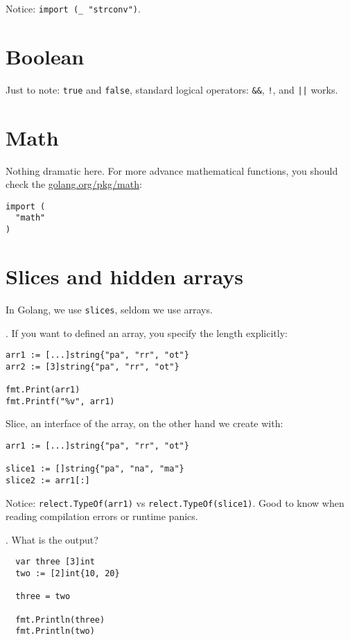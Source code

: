 \documentclass[11pt, letterpaper]{article}
\begin{document}
Notice: \texttt{import (_ "strconv")}.

\section{Boolean}

Just to note: \texttt{true} and \texttt{false}, standard logical operators: \texttt{&&}, \texttt{!}, and \texttt{||} works.

\section{Math}
Nothing dramatic here. For more advance mathematical functions, you should check the \href{https://golang.org/pkg/math}{golang.org/pkg/math}:
\begin{verbatim}
import (
  "math"
)
\end{verbatim}

\section{Slices and hidden arrays}
In Golang, we use \texttt{slices}, seldom we use arrays.

. If you want to defined an array, you specify the length explicitly:

\begin{verbatim}
arr1 := [...]string{"pa", "rr", "ot"}
arr2 := [3]string{"pa", "rr", "ot"}

fmt.Print(arr1)
fmt.Printf("%v", arr1)
\end{verbatim}

Slice, an interface of the array, on the other hand we create with:

\begin{verbatim}
arr1 := [...]string{"pa", "rr", "ot"}

slice1 := []string{"pa", "na", "ma"}
slice2 := arr1[:]
\end{verbatim}

Notice: \texttt{relect.TypeOf(arr1)} vs \texttt{relect.TypeOf(slice1)}. Good to know when reading compilation errors or runtime panics.

. What is the output?

\begin{verbatim}
  var three [3]int
  two := [2]int{10, 20}

  three = two

  fmt.Println(three)
  fmt.Println(two)
\end{verbatim}
\end{document}
